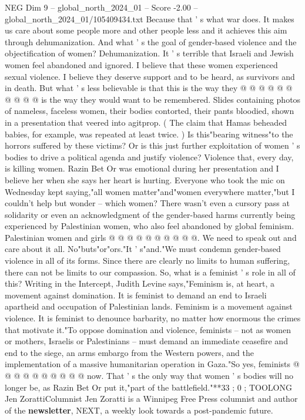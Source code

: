 \begin{textsample}{NEG Dim 9 – global\_north\_2024\_01 – Score -2.00 – global\_north\_2024\_01/105409434.txt}
Because that ' s what war does.
It makes us care about some people more and other people less and it achieves this aim through dehumanization.
And what ' s the goal of gender-based violence and the objectification of women?
Dehumanization.
It ' s terrible that Israeli and Jewish women feel abandoned and ignored.
I believe that these women experienced sexual violence.
I believe they deserve support and to be heard, as survivors and in death.
But what ' s less believable is that this is the way they @ @ @ @ @ @ @ @ @ @ is the way they would want to be remembered.
Slides containing photos of nameless, faceless women, their bodies contorted, their pants bloodied, shown in a presentation that veered into agitprop. ( The claim that Hamas beheaded babies, for example, was repeated at least twice. ) Is this"bearing witness"to the horrors suffered by these victims?
Or is this just further exploitation of women ' s bodies to drive a political agenda and justify violence?
Violence that, every day, is killing women.
Razin Bet Or was emotional during her presentation and I believe her when she says her heart is hurting.
Everyone who took the mic on Wednesday kept saying,"all women matter"and"women everywhere matter,"but I couldn't help but wonder -- which women?
There wasn't even a cursory pass at solidarity or even an acknowledgment of the gender-based harms currently being experienced by Palestinian women, who also feel abandoned by global feminism.
Palestinian women and girls @ @ @ @ @ @ @ @ @ @.
We need to speak out and care about it all.
No"buts"or"ors."It ' s"and."We must condemn gender-based violence in all of its forms.
Since there are clearly no limits to human suffering, there can not be limits to our compassion.
So, what is a feminist ' s role in all of this?
Writing in the Intercept, Judith Levine says,"Feminism is, at heart, a movement against domination.
It is feminist to demand an end to Israeli apartheid and occupation of Palestinian lands.
Feminism is a movement against violence.
It is feminist to denounce barbarity, no matter how enormous the crimes that motivate it."To oppose domination and violence, feminists -- not as women or mothers, Israelis or Palestinians -- must demand an immediate ceasefire and end to the siege, an arms embargo from the Western powers, and the implementation of a massive humanitarian operation in Gaza."So yes, feminists @ @ @ @ @ @ @ @ @ @ now.
That ' s the only way that women ' s bodies will no longer be, as Razin Bet Or put it,"part of the battlefield."**33 ; 0 ; TOOLONG Jen ZorattiColumnist Jen Zoratti is a Winnipeg Free Press columnist and author of the \textbf{newsletter}, NEXT, a weekly look towards a post-pandemic future.

\end{textsample}
